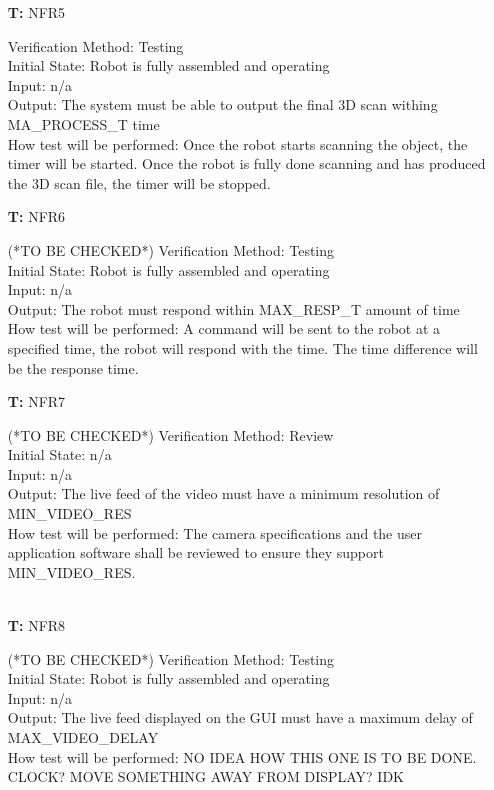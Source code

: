 \documentclass[12pt, titlepage]{article}
\newcounter{tnum} %
\begin{document}
\begin{itemize}
\item[\textbf{T\refstepcounter{tnum}\thetnum:}]{NFR5\\}

Verification Method: Testing	\\				
Initial State: Robot is fully assembled and operating	\\			
Input: n/a\\
Output: The system must be able to output the final 3D scan withing MA\_PROCESS\_T time \\
How test will be performed: Once the robot starts scanning the object, the timer will be started. Once the robot is fully done scanning and has produced the 3D scan file, the timer will be stopped. \\

\item[\textbf{T\refstepcounter{tnum}\thetnum:}]{NFR6\\}

(*TO BE CHECKED*)
Verification Method: Testing	\\				
Initial State: Robot is fully assembled	and operating\\	
Input: n/a\\
Output: The robot must respond within MAX\_RESP\_T amount of time \\
How test will be performed: A command will be sent to the robot at a specified time, the robot will respond with the time. The time difference will be the response time. \\

\item[\textbf{T\refstepcounter{tnum}\thetnum:}]{NFR7\\}

(*TO BE CHECKED*)
Verification Method: Review	\\				
Initial State: n/a	\\			
Input: n/a\\
Output: The live feed of the video must have a minimum resolution of  MIN\_VIDEO\_RES \\
How test will be performed: The camera specifications and the user application software shall be reviewed to ensure they support MIN\_VIDEO\_RES.\\ \\

\item[\textbf{T\refstepcounter{tnum}\thetnum:}]{NFR8\\}

(*TO BE CHECKED*)
Verification Method: Testing	\\				
Initial State: Robot is fully assembled	and operating\\			
Input: n/a\\
Output: The live feed displayed on the GUI must have a maximum delay of MAX\_VIDEO\_DELAY \\
How test will be performed: NO IDEA HOW THIS ONE IS TO BE DONE. CLOCK? MOVE SOMETHING AWAY FROM DISPLAY? IDK

\end{itemize}
\end{document}
